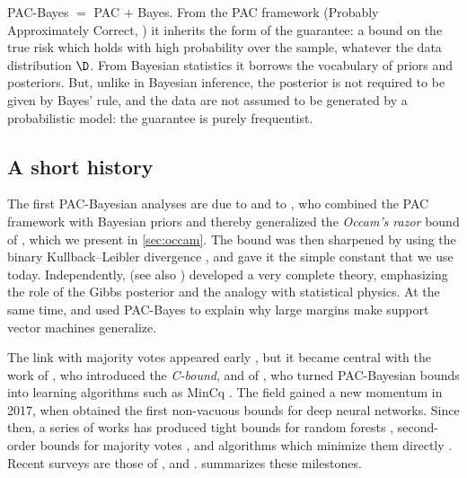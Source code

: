 \begin{intuition}
PAC-Bayes $=$ PAC $+$ Bayes. From the PAC framework (Probably Approximately
Correct, \citealp{valiant1984theory}) it inherits the form of the guarantee: a
bound on the true risk which holds with high probability over the sample,
whatever the data distribution $\D$. From Bayesian statistics it borrows the
vocabulary of priors and posteriors. But, unlike in Bayesian inference, the
posterior is not required to be given by Bayes' rule, and the data are not
assumed to be generated by a probabilistic model: the guarantee is purely
frequentist.
\end{intuition}

\subsection{A short history}

The first PAC-Bayesian analyses are due to \citet{shawe1997pac} and to
\citet{mcallester1998some,mcallester1999some,mcallester1999pac}, who combined
the PAC framework with Bayesian priors and thereby generalized the \emph{Occam's
razor} bound of \citet{blumer1987occam}, which we present in
\cref{sec:occam}. The bound was then sharpened by using the binary
Kullback--Leibler divergence \citep{seeger2002pac,langford2005tutorial}, and
\citet{maurer2004note} gave it the simple constant that we use today.
Independently, \citet{catoni2007pac} (see also \citealp{audibert2004pac,zhang2006information})
developed a very complete theory, emphasizing the role of the Gibbs posterior
and the analogy with statistical physics. At the same time,
\citet{langford2002pac} and \citet{mcallester2003simplified} used PAC-Bayes to
explain why large margins make support vector machines generalize.

The link with majority votes appeared early \citep{mcallester1999pac}, but it
became central with the work of \citet{lacasse2007pac}, who introduced the
\emph{C-bound}, and of \citet{germain2009pac,germain2015risk}, who turned
PAC-Bayesian bounds into learning algorithms such as MinCq
\citep{laviolette2011from}. The field gained a new momentum in 2017, when
\citet{dziugaite2017computing} obtained the first non-vacuous bounds for deep
neural networks. Since then, a series of works has produced tight bounds for
random forests \citep{lorenzen2019pac}, second-order bounds for majority votes
\citep{masegosa2020second,wu2021chebyshev}, and algorithms which minimize them
directly \citep{viallard2021self,zantedeschi2021learning}. Recent surveys are
those of \citet{guedj2019primer}, \citet{alquier2024user} and
\citet{hellstrom2025generalization}.  summarizes these milestones.

